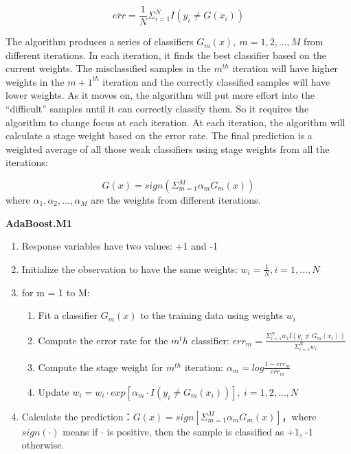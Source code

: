 \documentclass[12pt,]{krantz}
\begin{document}
\[\bar{err}=\frac{1}{N}\Sigma_{i=1}^NI(y_i\neq G(x_i))\]

The algorithm produces a series of classifiers \(G_m(x),\ m=1,2,...,M\) from different iterations. In each iteration, it finds the best classifier based on the current weights. The misclassified samples in the \(m^{th}\) iteration will have higher weights in the \(m+1^{th}\) iteration and the correctly classified samples will have lower weights. As it moves on, the algorithm will put more effort into the ``difficult'' samples until it can correctly classify them. So it requires the algorithm to change focus at each iteration. At each iteration, the algorithm will calculate a stage weight based on the error rate. The final prediction is a weighted average of all those weak classifiers using stage weights from all the iterations:

\[G(x)=sign ( \Sigma_{m=1}^M \alpha_{m}G_m(x))\]
where \(\alpha_1,\alpha_2,...,\alpha_M\) are the weights from different iterations.

\textbf{AdaBoost.M1}

\begin{enumerate}
\def\labelenumi{\arabic{enumi}.}
\item
  Response variables have two values: +1 and -1
\item
  Initialize the observation to have the same weights: \(w_i=\frac{1}{N},i=1,...,N\)
\item
  for m = 1 to M:

  \begin{enumerate}
  \def\labelenumii{(\alph{enumii})}
  \item
    Fit a classifier \(G_m(x)\) to the training data using weights \(w_i\)
  \item
    Compute the error rate for the \(m^th\) classifier: \(err_m=\frac{\Sigma_{i=1}^Nw_i I(y_i\neq G_m(x_i))}{\Sigma_{i=1}^Nw_i}\)
  \item
    Compute the stage weight for \(m^{th}\) iteration: \(\alpha_m=log\frac{1-err_m}{err_m}\)
  \item
    Update \(w_i = w_i\cdot exp[\alpha_m\cdot I(y_i \neq G_m(x_i))],\ i=1,2,\dots,N\)
  \end{enumerate}
\item
  Calculate the prediction：\(G(x)=sign[\Sigma_{m=1}^M\alpha_mG_m(x)]\)，where \(sign(\cdot)\) means if \(\cdot\) is positive, then the sample is classified as +1, -1 otherwise.
\end{enumerate}
\end{document}
